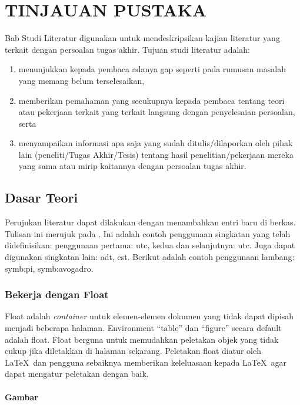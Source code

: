 \chapter{TINJAUAN PUSTAKA}
\label{chapter:2}

Bab Studi Literatur digunakan untuk mendeskripsikan kajian literatur yang terkait dengan persoalan tugas akhir. Tujuan studi literatur adalah:

\begin{enumerate}
    \item menunjukkan kepada pembaca adanya gap seperti pada rumusan masalah yang memang belum terselesaikan,
    \item memberikan pemahaman yang secukupnya kepada pembaca tentang teori atau pekerjaan terkait yang terkait langsung dengan penyelesaian persoalan, serta
    \item menyampaikan informasi apa saja yang sudah ditulis/dilaporkan oleh pihak lain (peneliti/Tugas Akhir/Tesis) tentang hasil penelitian/pekerjaan mereka yang sama atau mirip kaitannya dengan persoalan tugas akhir.
\end{enumerate}

\section{Dasar Teori}
Perujukan literatur dapat dilakukan dengan menambahkan entri baru di berkas. Tulisan ini merujuk pada \parencite{knuth2001art}. Ini adalah contoh penggunaan singkatan yang telah didefinisikan: penggunaan pertama: \gls{utc}, kedua dan selanjutnya: \gls{utc}. Juga dapat digunakan singkatan lain: \gls{adt}, \gls{est}. Berikut adalah contoh penggunaan lambang: \gls{symb:pi}, \gls{symb:avogadro}.

    \subsection{Bekerja dengan Float}

    Float adalah \textit{container} untuk elemen-elemen dokumen yang tidak dapat dipisah menjadi beberapa halaman. Environment ``table'' dan ``figure'' secara default adalah float. Float berguna untuk memudahkan peletakan objek yang tidak cukup jika diletakkan di halaman sekarang. Peletakan float diatur oleh \LaTeX\ dan pengguna sebaiknya memberikan keleluasaan kepada \LaTeX\ agar dapat mengatur peletakan dengan baik. 
    
    \subsubsection{Gambar}
    
